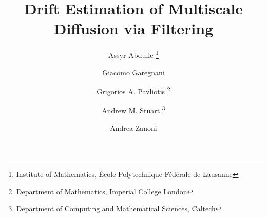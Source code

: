 \newcommand{\email}[1]{\href{#1}{#1}}
\newcommand{\TheTitle}{Drift Estimation of Multiscale Diffusion via Filtering} 
\newcommand{\TheAuthors}{A. Abdulle, G. Garegnani, G. Pavliotis, A. M. Stuart}
\title{\TheTitle}
\author{Assyr Abdulle \thanks{Institute of Mathematics, École Polytechnique Fédérale de Lausanne}
		\and Giacomo Garegnani  \samethanks
		\and Grigorios A. Pavliotis \thanks{Department of Mathematics, Imperial College London}
		\and Andrew M. Stuart \thanks{Department of Computing and Mathematical Sciences, Caltech}
		\and Andrea Zanoni \samethanks[1]
}
\date{}

\usepackage{amsopn}
\DeclareMathOperator{\diag}{diag}
\DeclarePairedDelimiter{\ceil}{\left\lceil}{\right\rceil}
\DeclarePairedDelimiter{\floor}{\lfloor}{\rfloor}
\newcommand{\abs}[1]{\left\lvert#1\right\rvert}
\newcommand{\norm}[1]{\left\|#1\right\|}
\renewcommand{\phi}{\varphi}
\renewcommand{\theta}{\vartheta}
\renewcommand{\Pr}{\mathbb{P}}
\newcommand{\btilde}{\widetilde}
\newcommand{\bhat}{\widehat}
\newcommand{\eqtext}[1]{\ensuremath{\stackrel{#1}{=}}}
\newcommand{\leqtext}[1]{\ensuremath{\stackrel{#1}{\leq}}}
\newcommand{\iid}{\ensuremath{\stackrel{\text{i.i.d.}}{\sim}}}
\newcommand{\totext}[1]{\ensuremath{\stackrel{#1}{\to}}}
\newcommand{\rightarrowtext}[1]{\ensuremath{\stackrel{#1}{\longrightarrow}}}
\newcommand{\leftrightarrowtext}[1]{\ensuremath{\stackrel{#1}{\longleftrightarrow}}}
\newcommand{\pdv}[2]{\ensuremath\partial_{#2}#1}
\newcommand{\N}{\mathbb{N}}
\newcommand{\R}{\mathbb{R}}
\newcommand{\C}{\mathbb{C}}
\newcommand{\OO}{\mathcal{O}}
\newcommand{\epl}{\varepsilon}
\newcommand{\diffL}{\mathcal{L}}
\newcommand{\defeq}{\coloneqq}
\newcommand{\eqdef}{\eqqcolon}
\newcommand{\Var}{\operatorname{Var}}
\newcommand{\E}{\operatorname{\mathbb{E}}}
\newcommand{\PP}{\operatorname{\mathbb{P}}}
\newcommand{\MSE}{\operatorname{MSE}}
\newcommand{\trace}{\operatorname{tr}}
\newcommand{\MH}{\mathrm{MH}}
\newcommand{\ttt}{\texttt}
\newcommand{\Hell}{d_{\mathrm{Hell}}}
\newcommand{\sksum}{{\textstyle\sum}}
\renewcommand{\d}{\mathrm{d}}
\newcommand{\dd}{\,\mathrm{d}}
\newcommand{\corr}[1]{{\color{red}#1}}
\newcommand{\Tau}{\tau}
\newcommand{\LL}{L}
\newcommand{\HH}{H}
\newcommand{\WW}{W}
\newcommand{\mbf}{\mathbf}
\newcommand{\bfs}{\boldsymbol}
\newcommand{\todo}{{\color{red} TO DO}}
\newcommand{\X}{\mathbb{X}}
\newcommand{\nablar}{\nabla_{\hat x}}
\newcommand{\eval}[1]{\bigr\rvert_{#1}}
\newcommand{\normm}[1]{\norm{#1}_a}
\newcommand{\gausspdf}[3]{\exp\left\{-\frac{(#1 - #2)^2}{#3}\right\}}

